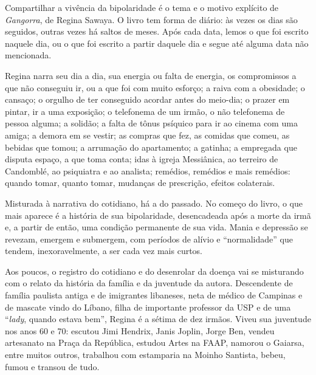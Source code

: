 


{Compartilhar a vivência da bipolaridade} é o tema e o motivo explícito
de \emph{Gangorra}{, de Regina Sawaya. O livro tem forma de diário: às
vezes os dias são seguidos, outras vezes há saltos de meses. Após cada
data, lemos o que foi escrito naquele dia, ou o que foi escrito a partir
daquele dia e segue até alguma data não mencionada.}

{Regina narra seu dia a dia, sua energia ou falta de energia, os
compromissos a que não conseguiu ir, ou a que foi com muito esforço; a
raiva com a obesidade; o cansaço; o orgulho de ter conseguido acordar
antes do meio-dia; o prazer em pintar, ir a uma exposição; o telefonema
de um irmão, o não telefonema de pessoa alguma; a solidão; a falta de
tônus psíquico para ir ao cinema com uma amiga; a demora em se vestir;
as compras que fez, as comidas que comeu, as bebidas que tomou; a
arrumação do apartamento; a gatinha; a empregada que disputa espaço, a
que toma conta; idas à igreja Messiânica, ao terreiro de Candomblé, ao
psiquiatra e ao analista; remédios, remédios e mais remédios: quando
tomar, quanto tomar, mudanças de prescrição, efeitos colaterais.}

{Misturada à narrativa do cotidiano, há a do passado. No começo do
livro, o que mais aparece é a história de sua bipolaridade, desencadeada
após a morte da irmã e, a partir de então, uma condição permanente de
sua vida. Mania e depressão se revezam, emergem e submergem, com
períodos de alívio e ``normalidade'' que tendem, inexoravelmente, a ser
cada vez mais curtos.}

{Aos poucos, o registro do cotidiano e do desenrolar da doença vai se
misturando com o relato da história da família e da juventude da autora.
Descendente de família paulista antiga e de imigrantes
libaneses, neta de médico de Campinas e de mascate vindo do Líbano,
filha de importante professor da USP e de uma ``}\emph{lady}{, quando
estava bem'', Regina é a sétima de dez irmãos. Viveu sua juventude nos
anos 60 e 70: escutou Jimi Hendrix, Janis Joplin, Jorge Ben, vendeu
artesanato na Praça da República, estudou Artes na FAAP, namorou o
Gaiarsa, entre muitos outros, trabalhou com estamparia na Moinho
Santista, bebeu, fumou e transou de tudo.}

\asterisc

